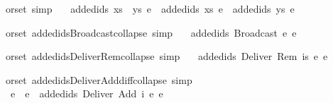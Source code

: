 \begin{isabellebody}
\isamarkupfalse%
\ {\isacharparenleft}\ orset{\isacharparenright}\ {\isacharbrackleft}simp{\isacharbrackright}{\isacharcolon}\isanewline
\ \ \ {\isachardoublequoteopen}added{\isacharunderscore}ids\ {\isacharparenleft}xs\ {\isacharat}\ ys{\isacharparenright}\ e\ {\isacharequal}\ added{\isacharunderscore}ids\ xs\ e\ {\isacharat}\ added{\isacharunderscore}ids\ ys\ e{\isachardoublequoteclose}\isanewline
\end{isabellebody}

\begin{isabellebody}
\isamarkupfalse%
\ {\isacharparenleft}\ orset{\isacharparenright}\ added{\isacharunderscore}ids{\isacharunderscore}Broadcast{\isacharunderscore}collapse\ {\isacharbrackleft}simp{\isacharbrackright}{\isacharcolon}\isanewline
\ \ \ {\isachardoublequoteopen}added{\isacharunderscore}ids\ {\isacharparenleft}{\isacharbrackleft}Broadcast\ e{\isacharbrackright}{\isacharparenright}\ e{\isacharprime}\ {\isacharequal}\ {\isacharbrackleft}{\isacharbrackright}{\isachardoublequoteclose}\isanewline
\end{isabellebody}

\begin{isabellebody}
\isamarkupfalse%
\ {\isacharparenleft}\ orset{\isacharparenright}\ added{\isacharunderscore}ids{\isacharunderscore}Deliver{\isacharunderscore}Rem{\isacharunderscore}collapse\ {\isacharbrackleft}simp{\isacharbrackright}{\isacharcolon}\isanewline
\ \ \ {\isachardoublequoteopen}added{\isacharunderscore}ids\ {\isacharparenleft}{\isacharbrackleft}Deliver\ {\isacharparenleft}Rem\ is\ e{\isacharparenright}{\isacharbrackright}{\isacharparenright}\ e{\isacharprime}\ {\isacharequal}\ {\isacharbrackleft}{\isacharbrackright}{\isachardoublequoteclose}\isanewline
\end{isabellebody}

\begin{isabellebody}
\isamarkupfalse%
\ {\isacharparenleft}\ orset{\isacharparenright}\ added{\isacharunderscore}ids{\isacharunderscore}Deliver{\isacharunderscore}Add{\isacharunderscore}diff{\isacharunderscore}collapse\ {\isacharbrackleft}simp{\isacharbrackright}{\isacharcolon}\isanewline
\ \ \ {\isachardoublequoteopen}e\ {\isasymnoteq}\ e{\isacharprime}\ {\isasymLongrightarrow}\ added{\isacharunderscore}ids\ {\isacharparenleft}{\isacharbrackleft}Deliver\ {\isacharparenleft}Add\ i\ e{\isacharparenright}{\isacharbrackright}{\isacharparenright}\ e{\isacharprime}\ {\isacharequal}\ {\isacharbrackleft}{\isacharbrackright}{\isachardoublequoteclose}\isanewline
\end{isabellebody}

